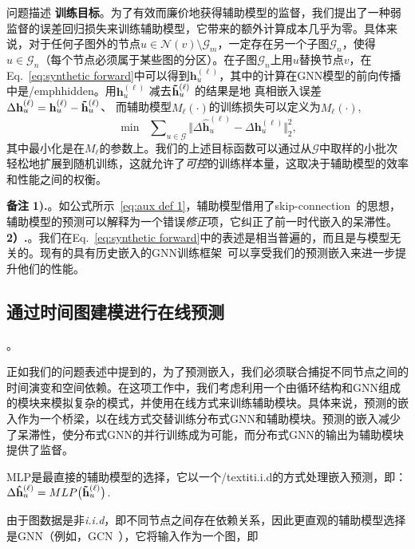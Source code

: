 \begin{section}{问题描述}
\textbf{训练目标}。为了有效而廉价地获得辅助模型的监督，我们提出了一种弱监督的误差回归损失来训练辅助模型，它带来的额外计算成本几乎为零。具体来说，对于任何子图外的节点$u \in \mathcal{N}(v) \setminus \mathcal{G}_{m}$，一定存在另一个子图$\mathcal{G}_{n}$，使得$u \in \mathcal{G}_{n}$（每个节点必须属于某些图的分区）。在子图$\mathcal{G}_{n}$上用$u$替换节点$v$，在Eq.~\ref{eq:synthetic forward}中可以得到$\mathbf{h}_{u}^{(\ell)}$，其中的计算在GNN模型的前向传播中是/emph{hidden}。用$\mathbf{h}_{u}^{(\ell)}$ 减去$\mathbf{\Tilde{h}}^{(\ell)}_u$ 的结果是地 真相嵌入误差 $\Delta\mathbf{h}^{(\ell)}_u = \mathbf{h}_{u}^{(\ell)} - \mathbf{\Tilde{h}}^{(\ell)}_u$、 而辅助模型$M_{\ell}(\cdot)$的训练损失可以定义为$M_{\ell}(\cdot)$, 
\begin{equation}
    \min\;\; \sum\nolimits_{u\in\mathcal{G}} \big\Vert \Delta\mathbf{\hat{h}}^{(\ell)}_u - \Delta\mathbf{h}^{(\ell)}_u \big\Vert_{2}^{2},
\label{eq:aux model loss}
\end{equation}
其中最小化是在$M_{\ell}$的参数上。我们的上述目标函数可以通过从$\mathcal{G}$中取样的小批次轻松地扩展到随机训练，这就允许了\emph{可控}的训练样本量，这取决于辅助模型的效率和性能之间的权衡。

\textbf{备注} \textbf{1).}。如公式所示~\ref{eq:aux def 1}，辅助模型借用了skip-connection~\cite{he2016identity}的思想，辅助模型的预测可以解释为一个错误\emph{修正}项，它纠正了前一时代嵌入的呆滞性。\textbf{2）.}。我们在Eq.~\ref{eq:synthetic forward}中的表述是相当普遍的，而且是与模型无关的。现有的具有历史嵌入的GNN训练框架~\cite{chen2018stochastic,fey2021gnnautoscale,wan2022pipegcn}可以享受我们的预测嵌入来进一步提升他们的性能。

\subsection{通过时间图建模进行在线预测}。

正如我们的问题表述中提到的，为了预测嵌入，我们必须联合捕捉不同节点之间的时间演变和空间依赖。在这项工作中，我们考虑利用一个由循环结构和GNN组成的模块来模拟复杂的模式，并使用在线方式来训练辅助模块。具体来说，预测的嵌入作为一个桥梁，以在线方式交替训练分布式GNN和辅助模块。预测的嵌入减少了呆滞性，使分布式GNN的并行训练成为可能，而分布式GNN的输出为辅助模块提供了监督。

MLP是最直接的辅助模型的选择，它以一个/textit{i.i.d}的方式处理嵌入预测，即：
$\Delta\mathbf{\hat{h}}^{(\ell)}_u = MLP\big(\mathbf{\Tilde{h}}^{(\ell)}_u\big)$. 

由于图数据是非\textit{i.i.d}，即不同节点之间存在依赖关系，因此更直观的辅助模型选择是GNN（例如，GCN~\cite{kipf2016semi}），它将输入作为一个图，即


\end{section}
